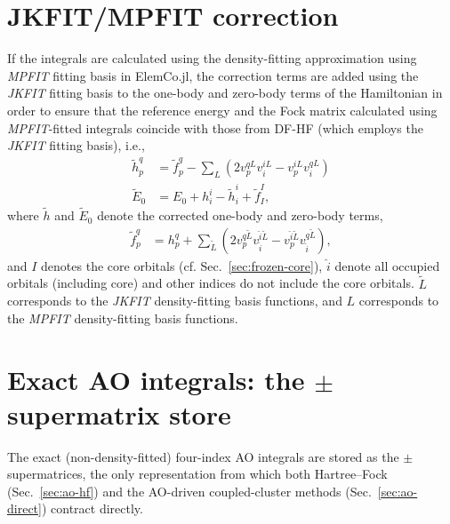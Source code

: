 \documentclass[a4paper,12pt,oneside]{book}
\newcommand{\sect}[1]{Sec.~\ref{#1}}
\newcommand{\elemcoil}{\textsf{ElemCo.jl}}
\begin{document}
\section{JKFIT/MPFIT correction} \label{sec:dfcorrection}
If the integrals are calculated using the density-fitting approximation using \textit{MPFIT}
fitting basis in \elemcoil, 
the correction terms are added using the \textit{JKFIT} fitting basis
to the one-body and zero-body terms of the Hamiltonian in order to ensure that the 
reference energy and the Fock matrix calculated using \textit{MPFIT}-fitted integrals
coincide with those from DF-HF (which employs the \textit{JKFIT} fitting basis), i.e.,
\begin{equation}
  \begin{aligned}
    \label{eq:df-correction}
    \tilde h_p^q &= \tilde f_p^q 
    - \sum_L \left(2v_{p}^{qL} v_{i}^{iL} - v_{p}^{iL} v_{i}^{qL}\right)\\
    \tilde E_0 &= E_0 + h_i^i - \tilde h_i^i + \tilde f_I^I, 
  \end{aligned} 
\end{equation}
where $\tilde h$ and $\tilde E_0$ denote the corrected one-body and zero-body terms,
\begin{equation}
  \begin{aligned}
    \label{eq:df-correction-fock}
    \tilde f_p^q &= h_p^q + \sum_{\tilde L} \left(2v_{p}^{q\tilde L} v_{\hat i}^{\hat i\tilde L} 
    - v_{p}^{\hat i\tilde L} v_{\hat i}^{q\tilde L}\right),
  \end{aligned} 
\end{equation}
and $I$ denotes the core orbitals (cf. \sect{sec:frozen-core}), 
$\hat i$ denote all occupied orbitals (including core)
and other indices do not include the core orbitals.
$\tilde L$ corresponds to the \textit{JKFIT} density-fitting basis functions,
and $L$ corresponds to the \textit{MPFIT} density-fitting basis functions.

\section{Exact AO integrals: the $\pm$ supermatrix store} \label{sec:pm-store}
The exact (non-density-fitted) four-index AO integrals are stored as the $\pm$
supermatrices, the only representation from which both Hartree--Fock
(Sec.~\ref{sec:ao-hf}) and the AO-driven coupled-cluster methods
(Sec.~\ref{sec:ao-direct}) contract directly.
\end{document}
